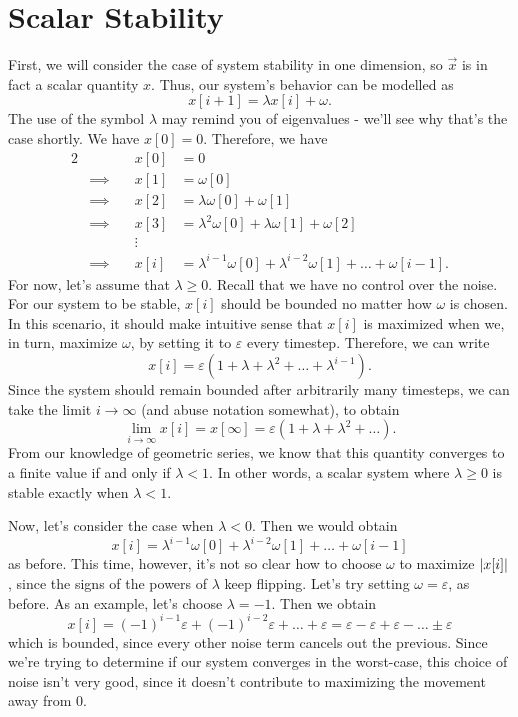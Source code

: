 \documentclass[letterpaper]{article}
\theoremstyle{remark}
\newcommand{\eps}{{\varepsilon}}    %
\newcommand{\eqn}[1]{\begin{alignat*}{2}#1\end{alignat*}}
\newcommand*{\thus}{&\implies\quad&}
\begin{document}
\section{Scalar Stability}
First, we will consider the case of system stability in one dimension, so $\vec{x}$ is in fact a scalar quantity $x$. Thus, our system's behavior can be modelled as
\[
    x[i + 1] = \lambda x[i] + \omega.
\]
The use of the symbol $\lambda$ may remind you of eigenvalues - we'll see why that's the case shortly. We have $x[0] = 0$. Therefore, we have
\eqn{
    && x[0] &= 0 \\
    \thus x[1] &= \omega[0] \\
    \thus x[2] &= \lambda \omega[0] + \omega[1] \\
    \thus x[3] &= \lambda^2 \omega[0] + \lambda \omega[1] + \omega[2] \\
    && \vdots & \\
    \thus x[i] &= \lambda^{i-1}\omega[0] + \lambda^{i-2}\omega[1] + \ldots + \omega[i - 1].
}
For now, let's assume that $\lambda \ge 0$. Recall that we have no control over the noise. For our system to be stable, $x[i]$ should be bounded no matter how $\omega$ is chosen. In this scenario, it should make intuitive sense that $x[i]$ is maximized when we, in turn, maximize $\omega$, by setting it to $\eps$ every timestep. Therefore, we can write
\[
    x[i] = \eps (1 + \lambda + \lambda^2 + \ldots + \lambda^{i-1}).
\]
Since the system should remain bounded after arbitrarily many timesteps, we can take the limit $i \to \infty$ (and abuse notation somewhat), to obtain
\[
    \lim_{i\to\infty}x[i] = x[\infty] = \eps(1 + \lambda + \lambda^2 + \ldots).
\]
From our knowledge of geometric series, we know that this quantity converges to a finite value if and only if $\lambda < 1$. In other words, a scalar system where $\lambda \ge 0$ is stable exactly when $\lambda < 1$. 

Now, let's consider the case when $\lambda < 0$. Then we would obtain
\[
    x[i] = \lambda^{i-1}\omega[0] + \lambda^{i-2}\omega[1] + \ldots + \omega[i - 1]
\]
as before. This time, however, it's not so clear how to choose $\omega$ to maximize $\abs{x[i]}$, since the signs of the powers of $\lambda$ keep flipping. Let's try setting $\omega = \eps$, as before. As an example, let's choose $\lambda = -1$. Then we obtain
\[
    x[i] = (-1)^{i - 1}\eps + (-1)^{i-2}\eps + \ldots + \eps = \eps - \eps + \eps - \ldots \pm \eps
\]
which is bounded, since every other noise term cancels out the previous. Since we're trying to determine if our system converges in the worst-case, this choice of noise isn't very good, since it doesn't contribute to maximizing the movement away from $0$. 
\end{document}
